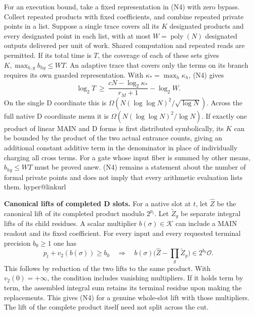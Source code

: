 \documentclass[11pt,a4paper]{article}
\makeatletter
\newcommand{\PaperSixCatalogue}[1]{\csname hyper@linkurl\endcsname{#1}{EVIDENCE_CATALOG.md}}
\newcommand{\PaperSixEvidence}[2]{\PaperSixCatalogue{#2}}
\makeatother
\begin{document}
For an execution bound, take a fixed representation in (N4) with zero
bypass. Collect repeated products with fixed coefficients, and combine
repeated private points in a list. Suppose a single trace covers all its
\(K\) designated products and every designated point in each list, with
at most \(W=\operatorname{poly}(N)\) designated outputs delivered per
unit of work. Shared computation and repeated reads are permitted. If
its total time is \(T\), the coverage of each of these sets gives
\(K,\max_{h,g} b_{hg}\le WT\). An adaptive trace that covers only the
terms on its branch requires its own guarded representation. With
\(\kappa_*=\max_h\kappa_h\), (N4) gives \[
 \log_2 T\ \ge\ \frac{cN-\log_2\kappa_*}{r_M+1}-\log_2 W.
\tag{N5}
\] On the single D coordinate this is
\(\Omega(N(\log\log N)^2/\sqrt{\log N})\). Across the full native D
coordinate menu it is \(\Omega(N(\log\log N)^2/\log N)\). If exactly one
product of linear MAIN and D forms is first distributed symbolically,
its \(K\) can be bounded by the product of the two actual entrance
counts, giving an additional constant additive term in the denominator
in place of individually charging all cross terms. For a gate whose
input fiber is summed by other means, \(b_{hg}\le WT\) must be proved
anew. (N4) remains a statement about the number of formal private points
and does not imply that every arithmetic evaluation lists them.
\PaperSixEvidence{evidence/research_v7/source/cost_contracts.md}{v7 execution contract}

\textbf{Canonical lifts of completed D slots.} For a native slot at
\(t\), let \(\widehat Z\) be the canonical lift of its completed product
modulo \(2^{p_t}\). Let \(\widetilde Z_g\) be separate integral lifts of
its child residues. A scalar multiplier \(b(\sigma)\in\mathcal K\) can
include a MAIN readout and its fixed coefficient. For every input and
every requested terminal precision \(b_0\ge1\) one has \[
 p_t+v_2(b(\sigma))\ge b_0
 \quad\Longrightarrow\quad
 b(\sigma)\bigl(\widehat Z-\textstyle\prod_g\widetilde Z_g\bigr)
                          \in 2^{b_0}\mathcal O.
\] This follows by reduction of the two lifts to the same product. With
\(v_2(0)=+\infty\), the condition includes vanishing multipliers. If it
holds term by term, the assembled integral sum retains its terminal
residue upon making the replacements. This gives (N4) for a genuine
whole-slot lift with those multipliers. The lift of the complete product
itself need not split across the cut.
\end{document}
